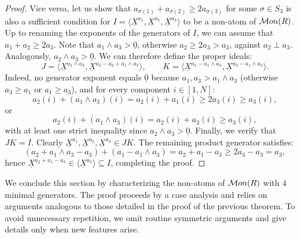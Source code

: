 \documentclass[10pt,a4paper]{amsart}
\providecommand\Mon{{\mathcal{M}{\rm on}}}
\begin{document}
\begin{proof}
Vice versa, let us show that $a_{\sigma(1)}+a_{\sigma(2)}\ge 2a_{\sigma(3)}$ for some $\sigma\in S_3$ is also a sufficient condition for $I=\langle \underline X^{a_1}, \underline X^{a_2}, \underline X^{a_3} \rangle$ to be a non-atom of $\Mon(R)$. Up to renaming the exponents of the generators of $I$, we can assume that $a_1+a_2\ge 2a_3$. Note that $a_1\wedge a_3>\underline 0$, otherwise $a_2\ge 2a_3 > a_3$, against $a_2\perp a_3$. Analogously, $a_2\wedge a_3>\underline 0$. We can therefore define the proper ideals:
\[
    J = \langle \underline{X}^{a_1 \wedge a_3}, \underline{X}^{a_2-a_3+a_1 \wedge a_3} \rangle, \qquad
    K = \langle \underline{X}^{a_1 - a_1 \wedge a_3}, \underline{X}^{a_3 - a_1 \wedge a_3} \rangle.
\]
Indeed, no generator exponent equals $\underline{0}$ because $a_1, a_3 > a_1 \wedge a_3$ (otherwise $a_3\ge a_1$ or $a_1\ge a_3$), and for every component $i \in [1,N]$:
\[
    a_2(i) + (a_1 \wedge a_3)(i) = a_2(i)+a_1(i)\ge 2a_3(i) \ge a_3(i),
\]
or
\[
    a_2(i) + (a_1 \wedge a_3)(i) = a_2(i)+a_3(i) \ge a_3(i),
\]
with at least one strict inequality since $a_2 \wedge a_3 > \underline{0}$. Finally, we verify that $JK = I$. Clearly $\underline{X}^{a_1}, \underline{X}^{a_2}, \underline{X}^{a_3} \in JK$. The remaining product generator satisfies:
\[
    (a_2 + a_1 \wedge a_3 - a_3) + (a_1 - a_1 \wedge a_3) = a_2 + a_1 - a_3 \ge 2a_3 - a_3 = a_3,
\]
hence $\underline{X}^{a_2+a_1-a_3} \in \langle \underline{X}^{a_3} \rangle \subseteq I$, completing the proof.
\end{proof}

We conclude this section by characterizing the non-atoms of $\Mon(R)$ with $4$ minimal generators. The proof proceeds by a case analysis and relies on arguments analogous to those detailed in the proof of the previous theorem. To avoid unnecessary repetition, we omit routine symmetric arguments and give details only when new features arise.
\end{document}
